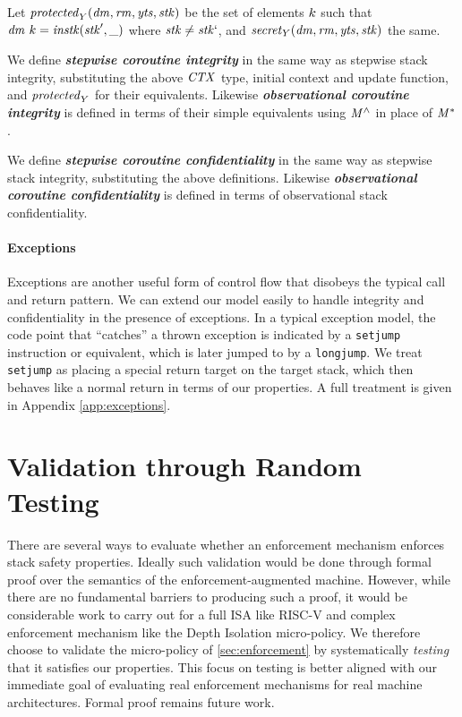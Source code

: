 \documentclass[10pt,conference]{ieeetran}%
\theoremstyle{definition}
\begin{document}
{
Let \(\mathit{protected}_Y(\mathit{dm},\mathit{rm},\mathit{yts},\mathit{stk})\) be the set of elements \(k\) such that
\(\mathit{dm} ~ k = \mathit{instk}(\mathit{stk}',\relax{\_})\) where \(\mathit{stk} \not = \mathit{stk}`\),
and \(\mathit{secret}_Y(\mathit{dm},\mathit{rm},\mathit{yts},\mathit{stk})\) the same.

We define \textbf{\em stepwise coroutine integrity} in the same way as stepwise stack integrity,
substituting the above \(\mathit{CTX}\) type, initial context and update
function, and \(\mathit{protected}_Y\) for their equivalents. Likewise
\textbf{\em observational coroutine integrity} is defined
in terms of their simple equivalents using \(\mathit{M}^\wedge\) in place of \(\mathit{M}^*\).

We define \textbf{\em stepwise coroutine confidentiality} in the same way as stepwise stack
integrity, substituting the above definitions. Likewise
\textbf{\em observational coroutine confidentiality} is defined in terms of observational
stack confidentiality.

\medskip

\paragraph*{Exceptions}

Exceptions are another useful form of control flow that disobeys the typical call and return pattern.
We can extend our model easily to handle integrity and confidentiality in the presence of exceptions.
In a typical exception model, the code point that ``catches'' a thrown exception is indicated by a {\tt setjump}
instruction or equivalent, which is later jumped to by a {\tt longjump}. We treat {\tt setjump} as placing
a special return target on the target stack, which then behaves like a normal return in terms of our properties.
A full treatment is given in Appendix \ref{app:exceptions}.

\section{Validation through Random Testing}
\label{sec:testing}

There are several ways to evaluate whether an enforcement mechanism enforces
stack safety properties. Ideally such validation would be done through formal proof over
the semantics of the enforcement-augmented machine.
However, while there are no fundamental barriers to producing such a proof,
it would be considerable work to carry out for a full ISA like RISC-V and
complex enforcement mechanism like the Depth Isolation micro-policy.
We therefore choose to validate the micro-policy of \cref{sec:enforcement} by 
systematically \emph{testing} that it satisfies our properties.
This focus on testing is better aligned with our immediate
goal of evaluating real enforcement mechanisms for real machine architectures.
Formal proof remains future work.

}
\end{document}
